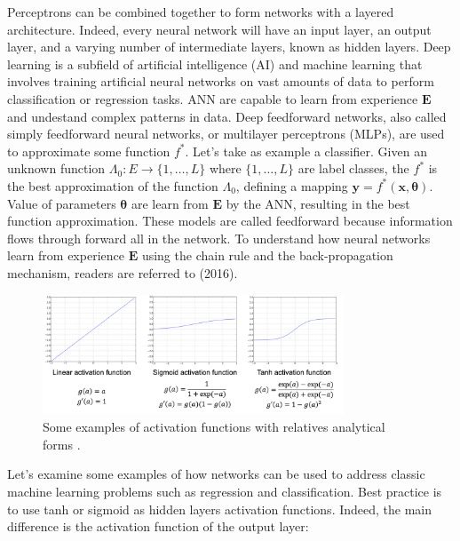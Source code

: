 Perceptrons can be combined together to form networks with a layered architecture. Indeed, every neural network will have an input layer, an output layer, and a varying number of intermediate layers, known as hidden layers. Deep learning is a subfield of artificial intelligence (AI) and machine learning that involves training artificial neural networks on vast amounts of data to perform classification or regression tasks. ANN are capable to learn from experience $\mathbf{E}$ and undestand complex patterns in data. Deep feedforward networks, also called simply feedforward neural networks, or multilayer perceptrons (MLPs), are used to approximate some function $f^*$. Let's take as example a classifier. Given an unknown function $\Lambda_0:E \rightarrow \{1,\dots,L\}$ where $\{1,\dots,L\}$ are label classes, the $f^*$ is the best approximation of the function $\Lambda_0$, defining a mapping $\mathbf{y}=f^*\left(\mathbf{x}, \bm{\theta} \right)$. Value of parameters $\bm{\theta}$ are learn from $\mathbf{E}$ by the ANN, resulting in the best function approximation. These models are called feedforward because information flows through forward all in the network. To understand how neural networks learn from experience $\mathbf{E}$ using the chain rule and the back-propagation mechanism, readers are referred to \citeauthor{goodfellow_deep_2016} (2016).
\begin{figure}
    \centering
    \includegraphics[width=0.8\textwidth]{Images/activationfunction.png}
    \caption[Activation functions.]{Some examples of activation functions with relatives analytical forms \cite{matteo_matteucci_perceptrons_2021}.}
    \label{fig:actfunc}
\end{figure}
Let's examine some examples of how networks can be used to address classic machine learning problems such as regression and classification. Best practice is to use tanh or sigmoid as hidden layers activation functions. Indeed, the main difference is the activation function of the output layer: 

